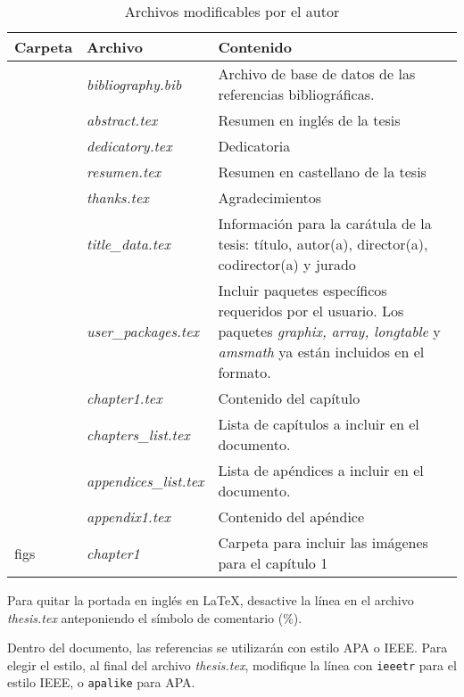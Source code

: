 \begin{table}[ht]
\renewcommand{\arraystretch}{1.3}
    \centering
    \begin{tabular}{>{\centering}p{}p{}p{}} \hline  
    \textbf{Carpeta}  & \textbf{Archivo} & \textbf{Contenido} \\ \hline 
        & \textit{bibliography.bib} & Archivo de base de datos de las referencias bibliográficas.  \\ \hline
    \multirow{6}{*}{preamble} & \textit{abstract.tex} &  Resumen en inglés de la tesis \\ 
     & \textit{dedicatory.tex} & Dedicatoria \\  
     & \textit{resumen.tex} & Resumen en castellano de la tesis \\  
     & \textit{thanks.tex} & Agradecimientos \\  
     & \textit{title\_data.tex} & Información para la carátula de la tesis: título, autor(a), director(a), codirector(a) y jurado \\ 
     & \textit{user\_packages.tex} & Incluir paquetes específicos requeridos por el usuario. Los paquetes \textit{graphix, array, longtable} y \textit{amsmath} ya están incluidos en el formato. \\ \hline
     \multirow{2}{*}{chapters} & \textit{chapter1.tex} &  Contenido del capítulo \\ 
    & \textit{chapters\_list.tex} & Lista de capítulos a incluir en el documento. \\ \hline
    \multirow{2}{*}{appendices} & \textit{appendices\_list.tex} &  Lista de apéndices a incluir en el documento. \\ 
    & \textit{appendix1.tex} & Contenido del apéndice \\ \hline
     figs & \textit{chapter1} &  Carpeta para incluir las imágenes para el capítulo 1 \\ \hline
    \end{tabular}
    \caption{Archivos modificables por el autor}
    \label{tab:UserFiles}
\end{table}

Para quitar la portada en inglés en \LaTeX, desactive la línea \verb!! en el archivo \textit{thesis.tex} anteponiendo el símbolo de comentario (\%).

Dentro del documento, las referencias se utilizarán con estilo APA o IEEE. Para elegir el estilo, al final del archivo \textit{thesis.tex}, modifique la línea \verb!! con \verb!ieeetr! para el estilo IEEE, o \verb!apalike! para APA.